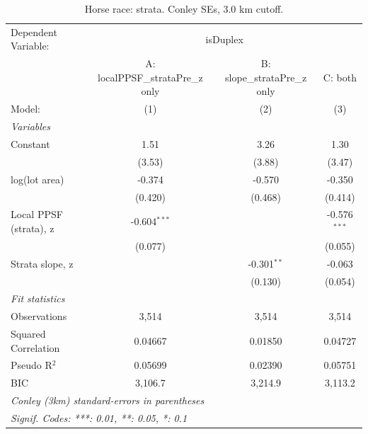 
\begin{table}[htbp]
   \caption{\label{tab:horseRace_strata_conley} Horse race: strata. Conley SEs, 3.0 km cutoff.}
   \centering
   \begin{tabular}{lccc}
      \tabularnewline \midrule \midrule
      Dependent Variable: & \multicolumn{3}{c}{isDuplex}\\
                             & A: localPPSF\_strataPre\_z only   & B: slope\_strataPre\_z only   & C: both \\   
      Model:                 & (1)                               & (2)                           & (3)\\  
      \midrule
      \emph{Variables}\\
      Constant               & 1.51                              & 3.26                          & 1.30\\   
                             & (3.53)                            & (3.88)                        & (3.47)\\   
      log(lot area)          & -0.374                            & -0.570                        & -0.350\\   
                             & (0.420)                           & (0.468)                       & (0.414)\\   
      Local PPSF (strata), z & -0.604$^{***}$                    &                               & -0.576$^{***}$\\   
                             & (0.077)                           &                               & (0.055)\\   
      Strata slope, z        &                                   & -0.301$^{**}$                 & -0.063\\   
                             &                                   & (0.130)                       & (0.054)\\   
      \midrule
      \emph{Fit statistics}\\
      Observations           & 3,514                             & 3,514                         & 3,514\\  
      Squared Correlation    & 0.04667                           & 0.01850                       & 0.04727\\  
      Pseudo R$^2$           & 0.05699                           & 0.02390                       & 0.05751\\  
      BIC                    & 3,106.7                           & 3,214.9                       & 3,113.2\\  
      \midrule \midrule
      \multicolumn{4}{l}{\emph{Conley (3km) standard-errors in parentheses}}\\
      \multicolumn{4}{l}{\emph{Signif. Codes: ***: 0.01, **: 0.05, *: 0.1}}\\
   \end{tabular}
\end{table}


